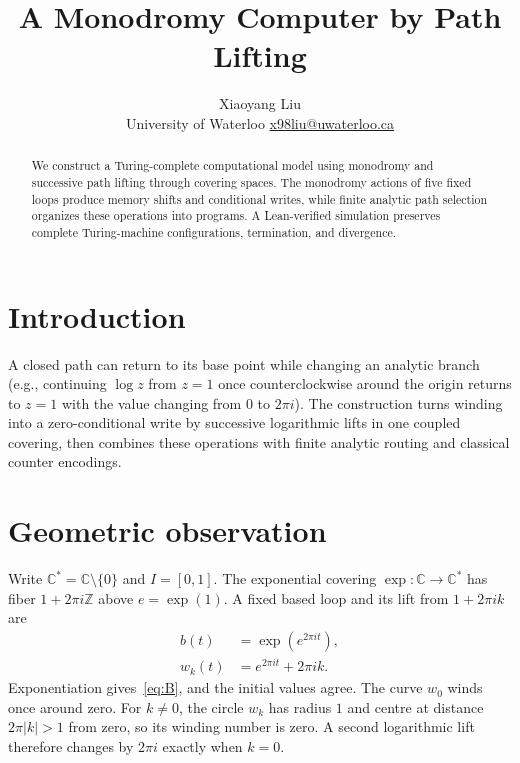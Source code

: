 \documentclass[11pt]{article}
\title{A Monodromy Computer by Path Lifting}
\author{Xiaoyang Liu\\[2pt]
 \small University of Waterloo \quad
 \href{mailto:x98liu@uwaterloo.ca}{x98liu@uwaterloo.ca}}
\date{}
\theoremstyle{definition}
\theoremstyle{plain}
\newcommand{\C}{\mathbb C}
\newcommand{\Z}{\mathbb Z}
\begin{document}
\maketitle
\thispagestyle{draftfirst}
\begin{abstract}
We construct a Turing-complete computational model using monodromy and 
successive path lifting through covering spaces.
The monodromy actions of five fixed loops produce memory shifts and 
conditional writes, while finite analytic path selection 
organizes these operations into programs. A Lean-verified simulation 
preserves complete Turing-machine configurations, termination, and 
divergence.
\end{abstract}

\section{Introduction}

A closed path can return to its base point while changing an analytic
branch (e.g., continuing $\log z$ from $z=1$ once counterclockwise
around the origin returns to $z=1$ with the value changing from
$0$ to $2\pi i$).
The construction turns winding into a zero-conditional write by
successive logarithmic lifts in one coupled covering, then combines
these operations with finite analytic routing and classical counter
encodings.

\section{Geometric observation}\label{sec:observation}

Write $\C^*=\C\setminus\{0\}$ and $I=[0,1]$.
The exponential covering $\exp:\C\to\C^*$ has fiber
$1+2\pi i\Z$ above $e=\exp(1)$. A fixed based loop and its lift
from $1+2\pi ik$ are
\begin{align}
 b(t)&=\exp(e^{2\pi it}),\label{eq:B}\\
 w_k(t)&=e^{2\pi it}+2\pi ik.\label{eq:circle}
\end{align}
Exponentiation gives~\eqref{eq:B}, and the initial values agree.
The curve $w_0$ winds once around zero. For $k\ne0$, the circle
$w_k$ has radius $1$ and centre at distance $2\pi|k|>1$ from zero,
so its winding number is zero. A second logarithmic lift therefore
changes by $2\pi i$ exactly when $k=0$.
\end{document}

